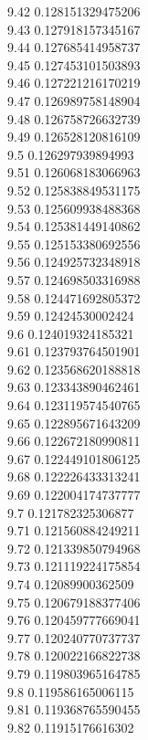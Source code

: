 {9.42	0.128151329475206\\
9.43	0.127918157345167\\
9.44	0.127685414958737\\
9.45	0.127453101503893\\
9.46	0.127221216170219\\
9.47	0.126989758148904\\
9.48	0.126758726632739\\
9.49	0.126528120816109\\
9.5	0.126297939894993\\
9.51	0.126068183066963\\
9.52	0.125838849531175\\
9.53	0.125609938488368\\
9.54	0.125381449140862\\
9.55	0.125153380692556\\
9.56	0.124925732348918\\
9.57	0.124698503316988\\
9.58	0.124471692805372\\
9.59	0.12424530002424\\
9.6	0.124019324185321\\
9.61	0.123793764501901\\
9.62	0.123568620188818\\
9.63	0.123343890462461\\
9.64	0.123119574540765\\
9.65	0.122895671643209\\
9.66	0.122672180990811\\
9.67	0.122449101806125\\
9.68	0.122226433313241\\
9.69	0.122004174737777\\
9.7	0.121782325306877\\
9.71	0.121560884249211\\
9.72	0.121339850794968\\
9.73	0.121119224175854\\
9.74	0.12089900362509\\
9.75	0.120679188377406\\
9.76	0.120459777669041\\
9.77	0.120240770737737\\
9.78	0.120022166822738\\
9.79	0.119803965164785\\
9.8	0.119586165006115\\
9.81	0.119368765590455\\
9.82	0.11915176616302\\
}
